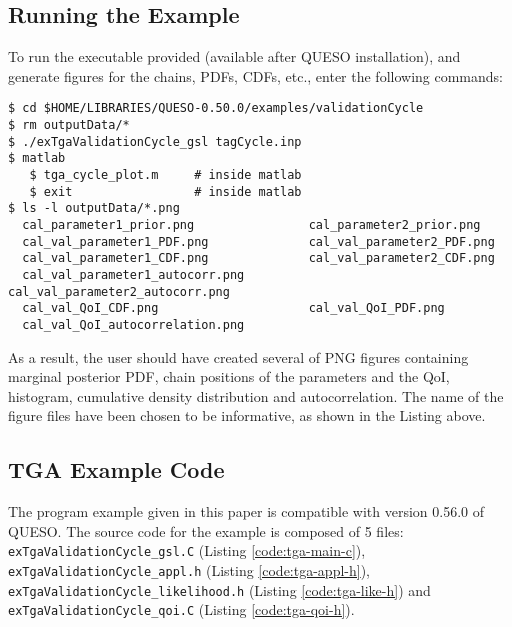 \subsection{Running the Example}\label{sec:tga-run}

To run the executable provided (available after QUESO installation), and generate figures for the chains, PDFs, CDFs, etc., enter the following commands:
\begin{lstlisting}[label={},caption={}]
$ cd $HOME/LIBRARIES/QUESO-0.50.0/examples/validationCycle
$ rm outputData/*
$ ./exTgaValidationCycle_gsl tagCycle.inp
$ matlab
   $ tga_cycle_plot.m     # inside matlab
   $ exit                 # inside matlab
$ ls -l outputData/*.png
  cal_parameter1_prior.png                cal_parameter2_prior.png
  cal_val_parameter1_PDF.png              cal_val_parameter2_PDF.png
  cal_val_parameter1_CDF.png              cal_val_parameter2_CDF.png
  cal_val_parameter1_autocorr.png         cal_val_parameter2_autocorr.png
  cal_val_QoI_CDF.png                     cal_val_QoI_PDF.png
  cal_val_QoI_autocorrelation.png
\end{lstlisting}


As a result, the user should have created several of PNG figures containing marginal posterior PDF, chain positions of the parameters and the QoI, histogram, cumulative density distribution and autocorrelation. The name of the figure files have been chosen to be informative, as shown in the Listing above.



\subsection{TGA Example Code}\label{sec:code-tga}



The program example given in this paper is compatible with version 0.56.0 of QUESO.
The source code for the example is composed of 5 files:
 \texttt{exTgaValidationCycle\_gsl.C} (Listing \ref{code:tga-main-c}),
 \texttt{exTgaValidationCycle\_appl.h} (Listing \ref{code:tga-appl-h}),
 \texttt{exTgaValidationCycle\_likelihood.h}  (Listing \ref{code:tga-like-h}) and
\texttt{exTgaValidationCycle\_qoi.C} (Listing \ref{code:tga-qoi-h}).





